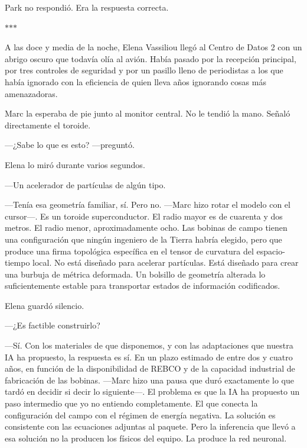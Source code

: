 \documentclass[11pt,a5paper,twoside]{book}
\begin{document}
Park no respondió. Era la respuesta correcta.

\vspace{1.5em}
\begin{center}$\ast$\quad$\ast$\quad$\ast$\end{center}
\vspace{1.5em}

A las doce y media de la noche, Elena Vassiliou llegó al Centro de Datos 2 con un abrigo oscuro que todavía olía al avión. Había pasado por la recepción principal, por tres controles de seguridad y por un pasillo lleno de periodistas a los que había ignorado con la eficiencia de quien lleva años ignorando cosas más amenazadoras.

Marc la esperaba de pie junto al monitor central. No le tendió la mano. Señaló directamente el toroide.

—¿Sabe lo que es esto? —preguntó.

Elena lo miró durante varios segundos.

—Un acelerador de partículas de algún tipo.

—Tenía esa geometría familiar, sí. Pero no. —Marc hizo rotar el modelo con el cursor—. Es un toroide superconductor. El radio mayor es de cuarenta y dos metros. El radio menor, aproximadamente ocho. Las bobinas de campo tienen una configuración que ningún ingeniero de la Tierra habría elegido, pero que produce una firma topológica específica en el tensor de curvatura del espacio-tiempo local. No está diseñado para acelerar partículas. Está diseñado para crear una burbuja de métrica deformada. Un bolsillo de geometría alterada lo suficientemente estable para transportar estados de información codificados.

Elena guardó silencio.

—¿Es factible construirlo?

—Sí. Con los materiales de que disponemos, y con las adaptaciones que nuestra IA ha propuesto, la respuesta es sí. En un plazo estimado de entre dos y cuatro años, en función de la disponibilidad de REBCO y de la capacidad industrial de fabricación de las bobinas. —Marc hizo una pausa que duró exactamente lo que tardó en decidir si decir lo siguiente—. El problema es que la IA ha propuesto un paso intermedio que yo no entiendo completamente. El que conecta la configuración del campo con el régimen de energía negativa. La solución es consistente con las ecuaciones adjuntas al paquete. Pero la inferencia que llevó a esa solución no la producen los físicos del equipo. La produce la red neuronal.
\end{document}
